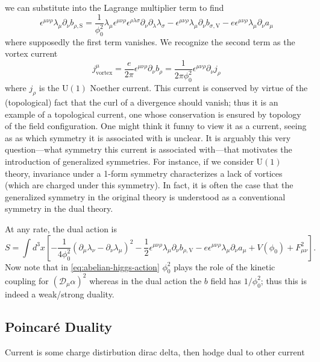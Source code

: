 \documentclass{report}
\begin{document}
we can substitute into the Lagrange multiplier term to find
\begin{equation*}
	\epsilon^{\mu\nu\rho}\lambda_\mu \partial_\nu b_{\rho, \text{S}}
	= \frac{1}{\phi_0^2} \lambda_\mu \epsilon^{\mu\nu\rho} \epsilon^{\rho\lambda\sigma}
		\partial_\nu \partial_\lambda \lambda_\sigma
		- \epsilon^{\mu\nu\rho} \lambda_{\mu}\partial_\nu b_{\sigma, \text{V}}
			- e \epsilon^{\mu\nu\rho} \lambda_\mu\partial_\nu a_\mu
\end{equation*}
where supposedly the first term vanishes. We recognize the second term as the
vortex current 
\begin{equation*}
	j_\text{vortex}^\mu 
		= \frac{e}{2\pi} \epsilon^{\mu\nu\rho} \partial_\nu b_{\rho}
		= \frac{1}{2\pi \phi_0^2} \epsilon^{\mu\nu\rho} \partial_\nu j_\rho
\end{equation*}
where $ j_\rho $ is the $ \text{U}(1) $ Noether current. This current is 
conserved by virtue of the (topological) fact that the curl of a divergence 
should vanish; thus it is an example of a topological current, one whose 
conservation is ensured by topology of the field configuration. One might think
it funny to view it as a current, seeing as as which symmetry it is associated 
with is unclear. It is arguably this very question---what symmetry this current 
is associated with---that motivates the introduction of generalized symmetries.
For instance, if we consider $ \text{U}(1) $ theory, invariance under a 1-form 
symmetry characterizes a lack of vortices (which are charged under this symmetry).
In fact, it is often the case that the generalized symmetry in the original 
theory is understood as a conventional symmetry in the dual theory. 

At any rate, the dual action is 
\begin{equation*}
	S = \int d^3 x 
		\left[
			- \frac{1}{4\phi_0^2}(\partial_\mu \lambda_\nu - \partial_\nu \lambda_\mu)^2 
			- \frac{1}{2} \epsilon^{\mu\nu\rho} \lambda_\mu \partial_\nu b_{\rho,\text{V}}
			- e\epsilon^{\mu\nu\rho}\lambda_\mu \partial_\nu a_\mu
			+ V(\phi_0) + F_{\mu\nu}^2
		\right].
\end{equation*}
Now note that in \cref{eq:abelian-higgs-action} $ \phi_0^2 $ plays the role of the kinetic 
coupling for $ (\mathcal{D}_\mu \alpha)^2 $ whereas in the dual action the 
$ b $ field has $ 1/\phi_0^2 $; thus this is indeed a weak/strong duality.

\subsection{Poincar\'e Duality}
Current is some charge distirbution dirac delta, then hodge dual to other 
current
\end{document}
